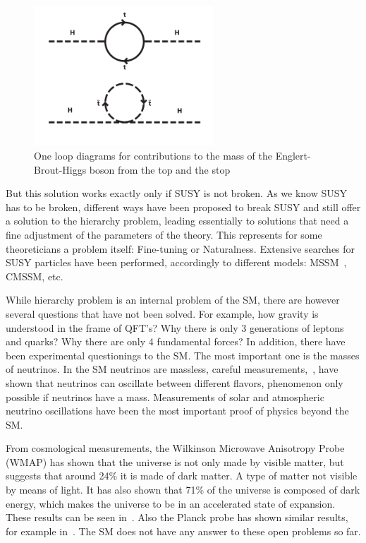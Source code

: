 \begin{figure}[!Hhtbp]
  \begin{center}
    \includegraphics[width=0.6\textwidth]{figs/SUSY.png}
    \caption{One loop diagrams for contributions to the mass of the Englert-Brout-Higgs boson from the top and the stop}
    \label{fig:susy}
  \end{center}
\end{figure}

But this solution works exactly only if SUSY is not broken. As we know SUSY has to be broken, different ways have been proposed to break SUSY and still offer a solution to the hierarchy problem, leading essentially to solutions that need a fine adjustment of the parameters of the theory. This represents for some theoreticians a problem itself: Fine-tuning or Naturalness. Extensive searches for SUSY particles have been performed, accordingly to different models: MSSM~\cite{Khachatryan:2014wca,Aad:2014vgg}, CMSSM, etc.

While hierarchy problem is an internal problem of the SM, there are however several questions that have not been solved. For example, how gravity is understood in the frame of QFT's? Why there is only 3 generations of leptons and quarks? Why there are only 4 fundamental forces? In addition, there have been experimental questionings to the SM. The most important one is the masses of neutrinos. In the SM neutrinos are massless, careful measurements,~\cite{Ashie:2004mr, Weinheimer:2013hya}, have shown that neutrinos can oscillate between different flavors, phenomenon only possible if neutrinos have a mass. Measurements of solar and atmospheric neutrino oscillations have been the most important proof of physics beyond the SM. 

From cosmological measurements, the Wilkinson Microwave Anisotropy Probe (WMAP) has shown that the universe is not only made by visible matter, but suggests that around 24\% it is made of dark matter. A type of matter not visible by means of light. It has also shown that 71\% of the universe is composed of dark energy, which makes the universe to be in an accelerated state of expansion. These results can be seen in~\cite{2013ApJS..208...20B, 2013ApJS..208...19H}. Also the Planck probe has shown similar results, for example in~\cite{Planck:2015xua}. The SM does not have any answer to these open problems so far. 

